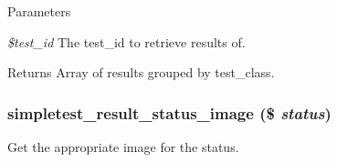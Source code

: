 \begin{DoxyParams}{Parameters}
\item[{\em \$test\_\-id}]The test\_\-id to retrieve results of. \end{DoxyParams}
\begin{DoxyReturn}{Returns}
Array of results grouped by test\_\-class. 
\end{DoxyReturn}
\hypertarget{simpletest_8pages_8inc_a113abd1a787e904816f29e409b4385ea}{
\subsubsection[{simpletest\_\-result\_\-status\_\-image}]{\setlength{\rightskip}{0pt plus 5cm}simpletest\_\-result\_\-status\_\-image (\$ {\em status})}}
\label{simpletest_8pages_8inc_a113abd1a787e904816f29e409b4385ea}
Get the appropriate image for the status.


